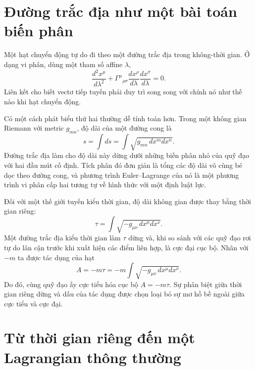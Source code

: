 \section{Đường trắc địa như một bài toán biến phân}

Một hạt chuyển động tự do đi theo một đường trắc địa trong không-thời gian. Ở dạng vi phân, dùng một tham số affine \(\lambda\),
\begin{equation}
\frac{d^2x^\mu}{d\lambda^2}
+\Gamma^\mu{}_{\rho\sigma}
\frac{dx^\rho}{d\lambda}
\frac{dx^\sigma}{d\lambda}=0.
\label{eq:l5-geodesic}
\end{equation}
Liên kết cho biết vectơ tiếp tuyến phải duy trì song song với chính nó như thế nào khi hạt chuyển động.

Có một cách phát biểu thứ hai thường dễ tính toán hơn. Trong một không gian Riemann với metric \(g_{mn}\), độ dài của một đường cong là
\begin{equation}
s=\int ds
=\int\sqrt{g_{mn}\,dx^m dx^n}.
\label{eq:l5-spatial-length}
\end{equation}
Đường trắc địa làm cho độ dài này dừng dưới những biến phân nhỏ của quỹ đạo với hai đầu mút cố định. Tích phân đó đơn giản là tổng các độ dài vô cùng bé dọc theo đường cong, và phương trình Euler--Lagrange của nó là một phương trình vi phân cấp hai tương tự về hình thức với một định luật lực.

Đối với một thế giới tuyến kiểu thời gian, độ dài không gian được thay bằng thời gian riêng:
\begin{equation}
\tau
=\int\sqrt{-g_{\mu\nu}\,dx^\mu dx^\nu}.
\label{eq:l5-proper-time-functional}
\end{equation}
Một đường trắc địa kiểu thời gian làm \(\tau\) dừng và, khi so sánh với các quỹ đạo rơi tự do lân cận trước khi xuất hiện các điểm liên hợp, là cực đại cục bộ. Nhân với \(-m\) ta được tác dụng của hạt
\begin{equation}
A=-m\tau
=-m\int\sqrt{-g_{\mu\nu}\,dx^\mu dx^\nu}.
\label{eq:l5-particle-action}
\end{equation}
Do đó, cùng quỹ đạo ấy cực tiểu hóa cục bộ \(A=-m\tau\). Sự phân biệt giữa thời gian riêng dừng và dấu của tác dụng được chọn loại bỏ sự mơ hồ bề ngoài giữa cực tiểu và cực đại.

\section{Từ thời gian riêng đến một Lagrangian thông thường}

